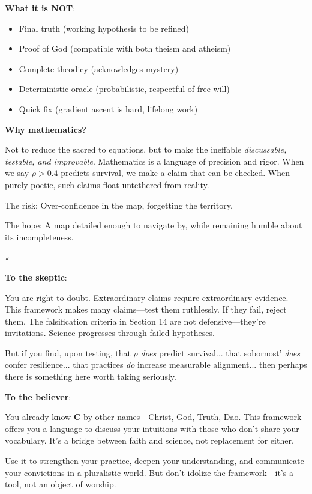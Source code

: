 \documentclass[11pt,a4paper]{article}
\theoremstyle{definition}
\theoremstyle{remark}
\begin{document}
\begin{small}
\begin{enumerate}
\begin{protocol}
\textbf{What it is NOT}:
\begin{itemize}
    \item Final truth (working hypothesis to be refined)
    \item Proof of God (compatible with both theism and atheism)
    \item Complete theodicy (acknowledges mystery)
    \item Deterministic oracle (probabilistic, respectful of free will)
    \item Quick fix (gradient ascent is hard, lifelong work)
\end{itemize}

\textbf{Why mathematics?}

Not to reduce the sacred to equations, but to make the ineffable \textit{discussable, testable, and improvable}. Mathematics is a language of precision and rigor. When we say \(\rho > 0.4\) predicts survival, we make a claim that can be checked. When purely poetic, such claims float untethered from reality.

The risk: Over-confidence in the map, forgetting the territory. 

The hope: A map detailed enough to navigate by, while remaining humble about its incompleteness.

\begin{center}
\(\star\)
\end{center}

\textbf{To the skeptic}:

You are right to doubt. Extraordinary claims require extraordinary evidence. This framework makes many claims—test them ruthlessly. If they fail, reject them. The falsification criteria in Section 14 are not defensive—they're invitations. Science progresses through failed hypotheses.

But if you find, upon testing, that \(\rho\) \textit{does} predict survival... that sobornost' \textit{does} confer resilience... that practices \textit{do} increase measurable alignment... then perhaps there is something here worth taking seriously.

\textbf{To the believer}:

You already know \(\mathbf{C}\) by other names—Christ, God, Truth, Dao. This framework offers you a language to discuss your intuitions with those who don't share your vocabulary. It's a bridge between faith and science, not replacement for either.

Use it to strengthen your practice, deepen your understanding, and communicate your convictions in a pluralistic world. But don't idolize the framework—it's a tool, not an object of worship.


\end{protocol}
\end{enumerate}
\end{small}
\end{document}
